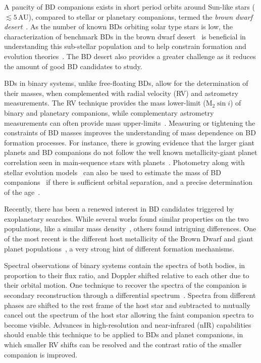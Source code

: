\documentclass[fleqn,usenatbib]{mnras}
\newcommand*\bl{\color{blue}}
\begin{document}
A paucity of BD companions exists in short period orbits around Sun-like stars (\(\lesssim5\)\,AU), compared to stellar or planetary companions, termed the \emph{brown dwarf desert}~\citep{halbwachs_exploring_2000,zucker_analysis_2001,sahlmann_search_2011}. As the number of known BDs orbiting solar type stars is low, the characterization of benchmark BDs in the brown dwarf desert~\citep[e.g.][]{crepp_trends_2016} is beneficial in understanding this sub-stellar population and to help constrain formation and evolution theories~\citep{whitworth_formation_2007}. The BD desert also provides a greater challenge as it reduces the amount of good BD candidates to study.

BDs in binary systems, unlike free-floating BDs, allow for the determination of their masses, when complemented with radial velocity (RV) and astrometry measurements. The RV technique provides the mass lower-limit (\(\textrm{M}_{2}\sin{i}\)) of binary and planetary companions, while complementary astrometry measurements can often provide mass upper-limits~\citep[e.g.][]{sahlmann_search_2011}. Measuring or tightening the constraints of BD masses improves the understanding of mass dependence on BD formation processes. For instance, there is growing evidence that the larger giant planets and BD companions do not follow the well known metallicity-giant planet correlation seen in main-sequence stars with planets~\citep[e.g.][]{santos_spectroscopic_2004,santos_observational_2017, maldonado_searching_2017}. Photometry along with stellar evolution models~\citep[e.g.][]{baraffe_evolutionary_2003,allard_btsettl_2013} can also be used to estimate the mass of BD companions~\citep[e.g.][]{moutou_eccentricity_2017} if there is sufficient orbital separation, and a precise determination of the age~\citep[e.g.][]{soderblom_ages_2010}.

Recently, there has been a renewed interest in BD candidates triggered by exoplanetary searches. While several works found similar properties on the two populations, like a similar {\bl mass} density~\citep{hatzes_definition_2015}, others found intriguing differences. One of the most recent is the different host metallicity of the Brown Dwarf and giant planet populations~\citep{santos_observational_2017, schlaufman_evidence_2018}, a very strong hint of different formation mechanisms.

Spectral observations of binary systems contain the spectra of both bodies, in proportion to their flux ratio, and Doppler shifted relative to each other due to their orbital motion. One technique to recover the spectra of the companion is secondary reconstruction through a differential spectrum~\citep{ferluga_separating_1997}. Spectra from different phases are shifted to the rest frame of the host star and subtracted to mutually cancel out the spectrum of the host star allowing the faint companion spectra to become visible. Advances in high-resolution and near-infrared (nIR) capabilities should enable this technique to be applied to BDs and planet companions, in which smaller RV shifts can be resolved and the contrast ratio of the smaller companion is improved.
\end{document}
